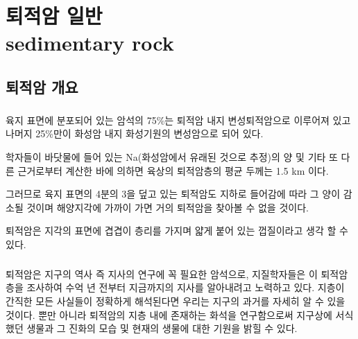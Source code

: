 \documentclass[12pt, a4paper, twoside]{book}
\begin{document}
	
	
	\clearpage
	\chapter{퇴적암 일반 \\ sedimentary rock}
	\minitoc				%
	


	\clearpage
	\section{퇴적암 개요}

		\paragraph{}
		육지 표면에 분포되어 있는 암석의 75\%는 퇴적암 내지 변성퇴적암으로 이루어져 있고 
		나머지 25\%만이 화성암 내지 화성기원의 변성암으로 되어 있다.

		학자들이 바닷물에 들어 있는 Na(화성암에서 유래된 것으로 추정)의 양 및 기타 또 다른 근거로부터 계산한 바에 의하면 
		육상의 퇴적암층의 평균 두께는 1.5 km 이다.

		그러므로 육지 표면의 4분의 3을 덮고 있는 퇴적암도 지하로 들어감에 따라 그 양이 감소될 것이며 
		해양지각에 가까이 가면 거의 퇴적암을 찾아볼 수 없을 것이다.

		퇴적암은 지각의 표면에 겹겹이 층리를 가지며 얇게 붙어 있는 껍질이라고 생각 할 수 있다.


		\paragraph{}
		퇴적암은 지구의 역사 즉 지사의 연구에 꼭 필요한 암석으로, 
		지질학자들은 이 퇴적암층을 조사하여 수억 년 전부터 지금까지의 지사를 알아내려고 노력하고 있다. 
		지층이 간직한 모든 사실들이 정확하게 해석된다면 우리는 지구의 과거를 자세히 알 수 있을 것이다. 
		뿐만 아니라 퇴적암의 지층 내에 존재하는 화석을 연구함으로써 지구상에 서식했던 생물과 그 진화의 모습 및 현재의 생물에 대한 기원을 밝힐 수 있다.
\end{document}
